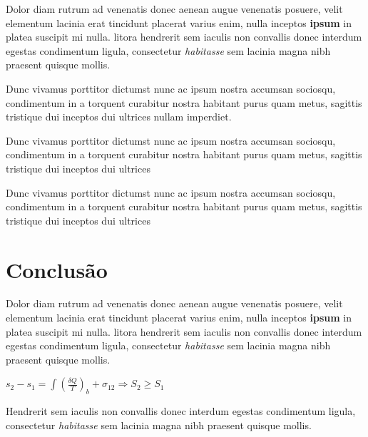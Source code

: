 \documentclass[a4paper, 12pt]{article}
\begin{document}
Dolor diam rutrum ad venenatis donec aenean augue venenatis posuere, velit elementum lacinia erat tincidunt placerat varius enim, nulla inceptos \textbf{ipsum} in platea suscipit mi nulla. litora hendrerit sem iaculis non convallis donec interdum egestas condimentum ligula, consectetur \textit{habitasse} sem lacinia magna nibh praesent quisque mollis. 

Dunc vivamus porttitor dictumst nunc ac ipsum nostra accumsan sociosqu, condimentum in a torquent curabitur nostra habitant purus quam metus, sagittis tristique dui inceptos dui ultrices nullam imperdiet. 

Dunc vivamus porttitor dictumst nunc ac ipsum nostra accumsan sociosqu, condimentum in a torquent curabitur nostra habitant purus quam metus, sagittis tristique dui inceptos dui ultrices

Dunc vivamus porttitor dictumst nunc ac ipsum nostra accumsan sociosqu, condimentum in a torquent curabitur nostra habitant purus quam metus, sagittis tristique dui inceptos dui ultrices

\newpage
\section{Conclusão}
Dolor diam rutrum ad venenatis donec aenean augue venenatis posuere, velit elementum lacinia erat tincidunt placerat varius enim, nulla inceptos \textbf{ipsum} in platea suscipit mi nulla. litora hendrerit sem iaculis non convallis donec interdum egestas condimentum ligula, consectetur \textit{habitasse} sem lacinia magna nibh praesent quisque mollis.

	\begin{center}
		\large
		$ s_{2} - s_{1} = \int(\frac{\delta Q}{T})_{b} + \sigma_{12} \Rightarrow S_{2} \geq S_{1}$
	\end{center}

Hendrerit sem iaculis non convallis donec interdum egestas condimentum ligula, consectetur \textit{habitasse} sem lacinia magna nibh praesent quisque mollis.
\end{document}

